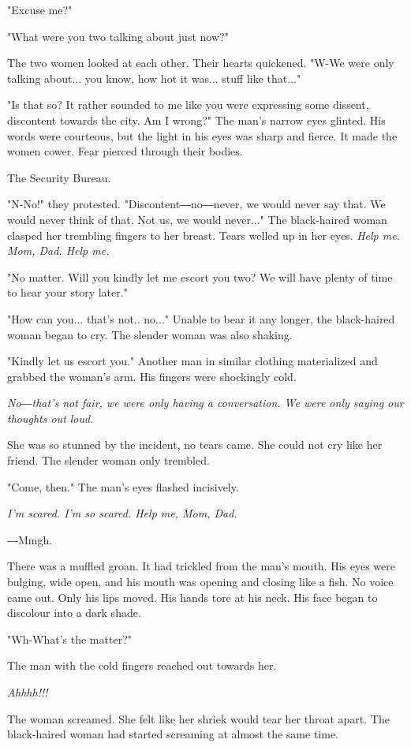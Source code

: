 "Excuse me?"

"What were you two talking about just now?"

The two women looked at each other. Their hearts quickened. "W-We were
only talking about... you know, how hot it was... stuff like that..."

"Is that so? It rather sounded to me like you were expressing some
dissent, discontent towards the city. Am I wrong?" The man's narrow eyes
glinted. His words were courteous, but the light in his eyes was sharp
and fierce. It made the women cower. Fear pierced through their bodies.

The Security Bureau.

"N-No!" they protested. "Discontent―no―never, we would never say that.
We would never think of that. Not us, we would never..." The
black-haired woman clasped her trembling fingers to her breast. Tears
welled up in her eyes. \emph{Help me. Mom, Dad. Help me.}

"No matter. Will you kindly let me escort you two? We will have plenty
of time to hear your story later."

"How can you... that's not.. no..." Unable to bear it any longer, the
black-haired woman began to cry. The slender woman was also shaking.

"Kindly let us escort you." Another man in similar clothing materialized
and grabbed the woman's arm. His fingers were shockingly cold.

\emph{No―that's not fair, we were only having a conversation. We were only
saying our thoughts out loud.}

She was so stunned by the incident, no tears came. She could not cry
like her friend. The slender woman only trembled.

"Come, then." The man's eyes flashed incisively.

\emph{I'm scared. I'm so scared. Help me, Mom, Dad.}

―Mmgh.

There was a muffled groan. It had trickled from the man's mouth. His
eyes were bulging, wide open, and his mouth was opening and closing like
a fish. No voice came out. Only his lips moved. His hands tore at his
neck. His face began to discolour into a dark shade.

"Wh-What's the matter?"

The man with the cold fingers reached out towards her.

\emph{Ahhhh!!!}

The woman screamed. She felt like her shriek would tear her throat
apart. The black-haired woman had started screaming at almost the same
time.

